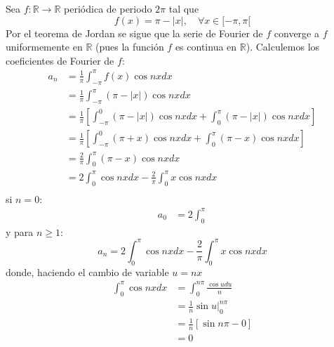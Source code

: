 \documentclass[12pt]{report}
\newcounter{it}
\theoremstyle{largebreak}
\renewcommand{\geq}{\ensuremath{\geqslant}}
\newcommand\abs[1]{\ensuremath{\left|#1\right|}}
\newcommand\cf[3]{\ensuremath{#1:#2\rightarrow#3}}
\begin{document}
    \begin{exa}
        Sea $\cf{f}{\mathbb{R}}{\mathbb{R}}$ periódica de periodo $2\pi$ tal que
        \begin{equation*}
            f(x)=\pi-\abs{x},\quad\forall x\in[-\pi,\pi[
        \end{equation*}
        Por el teorema de Jordan se sigue que la serie de Fourier de $f$ converge a $f$ uniformemente en $\mathbb{R}$ (pues la función $f$ es continua en $\mathbb{R}$). Calculemos los coeficientes de Fourier de $f$:
        \begin{equation*}
            \begin{split}
                a_n&=\frac{1}{\pi}\int_{ -\pi}^\pi f(x)\cos nxdx\\
                &=\frac{1}{\pi}\int_{ -\pi}^\pi (\pi-\abs{x})\cos nxdx\\
                &=\frac{1}{\pi}\left[\int_{ -\pi}^0 (\pi-\abs{x})\cos nxdx+\int_{0}^\pi (\pi-\abs{x})\cos nxdx\right]\\
                &=\frac{1}{\pi}\left[\int_{ -\pi}^0 (\pi+x)\cos nxdx+\int_{0}^\pi (\pi-x)\cos nxdx\right]\\
                &=\frac{2}{\pi}\int_0^{\pi}(\pi-x)\cos nxdx\\
                &=2\int_0^{\pi}\cos nxdx-\frac{2}{\pi}\int_{0}^\pi x\cos nxdx \\
            \end{split}
        \end{equation*}
        si $n=0$:
        \begin{equation*}
            \begin{split}
                a_0&=2\int_0^{\pi}
            \end{split}
        \end{equation*}
        y para $n\geq1$:
        \begin{equation*}
            a_n=2\int_0^{\pi}\cos nxdx-\frac{2}{\pi}\int_{0}^\pi x\cos nxdx
        \end{equation*}
        donde, haciendo el cambio de variable $u=nx$
        \begin{equation*}
            \begin{split}
                \int_0^{\pi}\cos nxdx&=\int_0^{ n\pi}\frac{\cos udu}{n}\\
                &=\frac{1}{n}\sin u\Big|_0^{n\pi}\\
                &=\frac{1}{n}[\sin n\pi-0]\\
                &=0\\

\end{split}
\end{equation*}
\end{exa}
\end{document}
